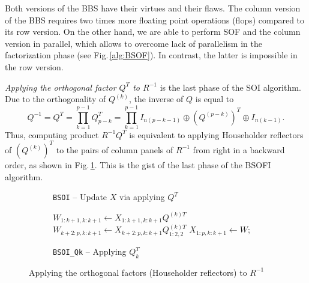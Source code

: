 \documentclass{llncs}
\begin{document}

Both versions of the BBS have their virtues and their flaws. 
The column version of the BBS requires 
two times more floating point operations (flops) compared to its row version. 
On the other hand, 
we are able to perform 
SOF and the column version in parallel, 
which allows to overcome lack of parallelism 
in the factorization phase (see Fig.\,\ref{alg:BSOF}).
In contrast, 
the latter is impossible in the row version. %

\textit%
{Applying the orthogonal factor $Q^T$ to $R^{-1}$} \label{sec:BSOI}
is the last phase of the SOI algorithm.
Due to the orthogonality of $Q^{(k)}$, the inverse of $Q$ is equal to 
\begin{equation}
  Q^{-1} = Q^{T} = \prod_{k=1}^{p-1} Q_{p-k}^{T} = 
  \prod_{k=1}^{p-1} I_{n(p-k-1)}\oplus \left(Q^{(p-k)}\right)^{T} \oplus 
  I_{n(k-1)}.
\end{equation}
Thus, computing product $R^{-1} Q^{T}$ is equivalent to
applying Householder reflectors of $\left(Q^{(k)}\right)^{T}$ to 
the pairs of column panels of $R^{-1}$ from right in a backward order, 
as shown in Fig.\,\ref{alg:BSOI_Cycle}. 
This is the gist of the last phase of the BSOFI algorithm.
\begin{figure}[t]%
  \centering
  \begin{subfigure}[t]{0.49\linewidth}%
    \begin{algorithm}[H]
      \BlankLine

      \BlankLine%
    \end{algorithm}    
    \caption{{\tt BSOI} -- Update $X$ via applying $Q^{T}$
      \label{alg:BSOI_Cycle}}
  \end{subfigure}
  \hfill
  \begin{subfigure}[t]{0.5\linewidth}%
    \begin{algorithm}[H]

      $W_{1:k+1,k:k+1} \gets X_{1:k+1,k:k+1} Q^{(k)T} $\;
      $W_{k+2:p,k:k+1} \gets X_{k+2:p,k:k+1} Q_{1:2,2}^{(k)T}$\;
      $X_{1:p,k:k+1} \gets W$;
    \end{algorithm}    
    \caption{{\tt BSOI\_Qk} -- Applying $Q_k^{T}$
      \label{alg:BSOI_Qk}}
  \end{subfigure}
  \caption{Applying the orthogonal factors (Householder reflectors) to $R^{-1}$%
    \label{alg:BSOI}}
\end{figure}
\end{document}
